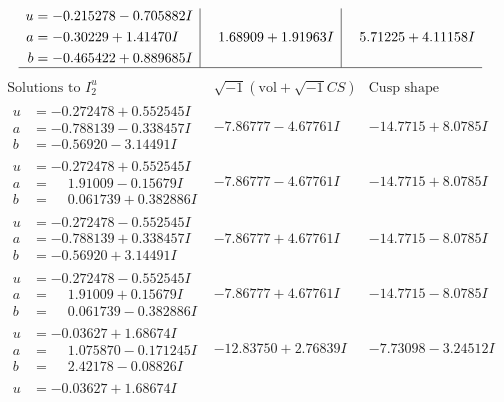 \documentclass[1p]{elsarticle_modified}
\theoremstyle{definition}
\newcommand{\I}{\sqrt{-1}}
\begin{document}
$$\begin{array}{c|c|c}
\begin{aligned}
u &= -0.215278 - 0.705882 I \\
a &= -0.30229 + 1.41470 I \\
b &= -0.465422 + 0.889685 I\end{aligned}
 & \phantom{-}1.68909 + 1.91963 I & \phantom{-}5.71225 + 4.11158 I\\
 \hline 
 \end{array}$$\newpage$$\begin{array}{c|c|c}  
\text{Solutions to }I^u_{2}& \I (\text{vol} + \sqrt{-1}CS) & \text{Cusp shape}\\
 \hline 
\begin{aligned}
u &= -0.272478 + 0.552545 I \\
a &= -0.788139 - 0.338457 I \\
b &= -0.56920 - 3.14491 I\end{aligned}
 & -7.86777 - 4.67761 I & -14.7715 + 8.0785 I \\ \hline\begin{aligned}
u &= -0.272478 + 0.552545 I \\
a &= \phantom{-}1.91009 - 0.15679 I \\
b &= \phantom{-}0.061739 + 0.382886 I\end{aligned}
 & -7.86777 - 4.67761 I & -14.7715 + 8.0785 I \\ \hline\begin{aligned}
u &= -0.272478 - 0.552545 I \\
a &= -0.788139 + 0.338457 I \\
b &= -0.56920 + 3.14491 I\end{aligned}
 & -7.86777 + 4.67761 I & -14.7715 - 8.0785 I \\ \hline\begin{aligned}
u &= -0.272478 - 0.552545 I \\
a &= \phantom{-}1.91009 + 0.15679 I \\
b &= \phantom{-}0.061739 - 0.382886 I\end{aligned}
 & -7.86777 + 4.67761 I & -14.7715 - 8.0785 I \\ \hline\begin{aligned}
u &= -0.03627 + 1.68674 I \\
a &= \phantom{-}1.075870 - 0.171245 I \\
b &= \phantom{-}2.42178 - 0.08826 I\end{aligned}
 & -12.83750 + 2.76839 I & -7.73098 - 3.24512 I \\ \hline\begin{aligned}
u &= -0.03627 + 1.68674 I \\

\end{aligned}
\end{array}$$
\end{document}
